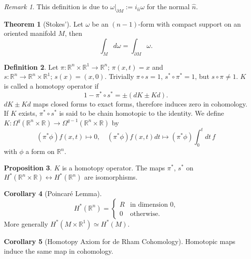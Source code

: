 \documentclass[twocolumn]{article}
\theoremstyle{definition}
\newtheorem{definition}{Definition}[section]
\newtheorem{theorem}[definition]{Theorem}
\newtheorem{proposition}[definition]{Proposition}
\newtheorem{corollary}[definition]{Corollary}
\theoremstyle{remark}
\newtheorem*{remark}{Remark}
\begin{document}
\begin{remark}
    This definition is due to $\omega|_{\partial M} := i_{\hat{n}} \omega$ for the normal $\hat{n}$.
\end{remark}
\begin{theorem}[Stokes']
    Let $\omega$ be an $(n-1)$-form with compact support on an oriented manifold $M$, then
    \begin{equation}
        \int_M d\omega = \int_{\partial M} \omega.
    \end{equation}
\end{theorem}

\begin{definition}
    Let $\pi: \mathbb{R}^n \times \mathbb{R}^1 \rightarrow \mathbb{R}^n;\, \pi(x, t) = x$ and
    $s: \mathbb{R}^n \rightarrow \mathbb{R}^n \times \mathbb{R}^1;\, s(x) = (x, 0)$.
    Trivially $\pi \circ s = 1$, $s^* \circ \pi^* = 1$, but $s \circ \pi \neq 1$.
    $K$ is called a homotopy operator if
    \begin{equation}
        1 - \pi^* \circ s^* = \pm(dK \pm Kd).
    \end{equation}
    $dK \pm Kd$ maps closed forms to exact forms, therefore induces zero in cohomology.
    If $K$ exists, $\pi^* \circ s^*$ is said to be chain homotopic to the identity.
    We define $K: \Omega^q(\mathbb{R}^n \times \mathbb{R}) \rightarrow \Omega^{q-1}(\mathbb{R}^n \times \mathbb{R})$ by
    \begin{equation}
        (\pi^* \phi)f(x, t) \mapsto 0,\quad
        (\pi^* \phi)f(x, t) dt \mapsto (\pi^* \phi) \int^t_0 dt\, f
    \end{equation}
    with $\phi$ a form on $\mathbb{R}^n$.
\end{definition}
\begin{proposition}
    $K$ is a homotopy operator.
    The maps $\pi^*$, $s^*$ on $H^*(\mathbb{R}^n \times \mathbb{R}) \leftrightarrow H^*(\mathbb{R}^n)$ are isomorphisms.
\end{proposition}
\begin{corollary}[Poincaré Lemma]
    \begin{equation}
        H^*(\mathbb{R}^n) =
        \begin{cases}
            R & \textrm{in dimension 0,}\\
            0 & \textrm{otherwise.}
        \end{cases}
    \end{equation}
    More generally $H^*(M \times \mathbb{R}^1) \simeq H^*(M)$.
\end{corollary}
\begin{corollary}[Homotopy Axiom for de Rham Cohomology]
    Homotopic maps induce the same map in cohomology.
\end{corollary}
\end{document}

